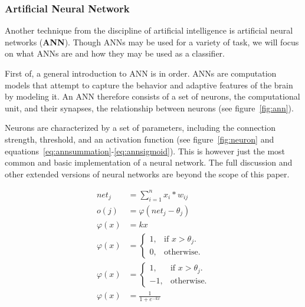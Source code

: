 \subsubsection{Artificial Neural Network}
	Another technique from the discipline of artificial intelligence is artificial neural networks (\textbf{ANN}).
	Though ANNs may be used for a variety of task, we will focus on what ANNs are and how they may be used as
	a classifier. 
	
	\bigskip\noindent
	First of, a general introduction to ANN is in order. ANNs are computation models that attempt to capture
	the behavior and adaptive features of the brain by modeling it.
	An ANN therefore consists of a set of neurons, the computational unit, and their synapses, the relationship between neurons (see figure~\ref{fig:ann}).
	
	
	\bigskip\noindent
	Neurons are characterized by a set of parameters, including the connection strength, threshold, and an activation function
	(see figure~\ref{fig:neuron} and equations~\ref{eq:annsummation}-\ref{eq:annsigmoid}). 
	This is however just the most common and basic implementation of a neural network. 
	The full discussion and other extended versions of neural networks are beyond the scope of this paper.
	
	\begin{figure}
		\begin{align}
			net_j &= \sum_{i=1}^n x_i*w_{ij}\label{eq:annsummation}\\
			o(j) &= \varphi (net_j - \theta_j)\label{eq:annthreshold}\\
			\varphi(x) &= kx\label{eq:annlinear}\\
			\varphi(x) &= \begin{cases}
					1, & \text{if $x > \theta_j$}.\\
					0, & \text{otherwise.}
				\end{cases}\label{eq:annbinary}\\
			\varphi(x) &= \begin{cases}
					1, & \text{if $x > \theta_j$}.\\
					-1, & \text{otherwise.}
				\end{cases}\label{eq:annbipolar}\\
			\varphi(x) &= \frac{1}{1+e^{-kx}}\label{eq:annsigmoid}
		\end{align}
	\end{figure}
	
